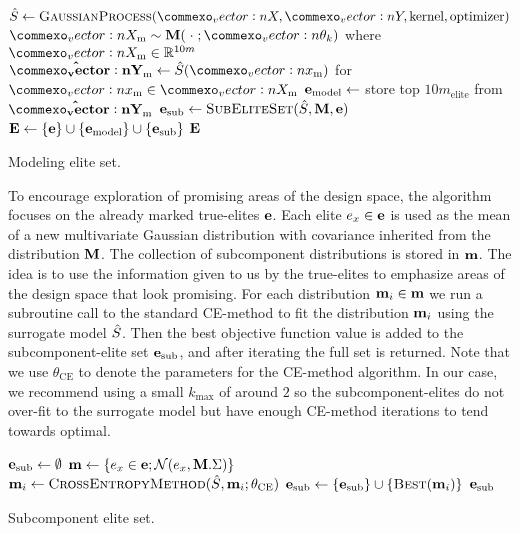 \begin{algorithm}[ht]
  \begin{algorithmic}
    \State $\surrogate \leftarrow \textproc{GaussianProcess}(\mat{X}, \mat{Y}, \text{kernel}, \text{optimizer})$ %
    \State $\mat{X}_\text{m} \sim \M(\;\cdot\;; \vec{\theta}_k)$ where $\mat{X}_\text{m} \in \R^{10m}$
    \State $\mathbf{\hat{\mat{Y}}}_\text{m} \leftarrow \surrogate(\vec{x}_\text{m})$ for $\vec{x}_\text{m} \in \mat{X}_\text{m}$
    \State $\mathbf{e}_\text{model} \leftarrow$ store top $10m_\text{elite}$ from $\mathbf{\hat{\mat{Y}}}_\text{m}$
    \State $\e_\text{sub} \leftarrow \textproc{SubEliteSet}(\surrogate, \M, \e)$
    \State $\mathbf{E} \leftarrow \{ \mathbf{e} \} \cup \{ \mathbf{e}_\text{model} \} \cup \{ \mathbf{e}_\text{sub} \}$ 
    \State \Return $\mathbf{E}$
  \EndFunction
  \end{algorithmic}
  \caption{\label{alg:model_elite_set} Modeling elite set.}
\end{algorithm}

To encourage exploration of promising areas of the design space, the algorithm  focuses on the already marked true-elites $\mathbf{e}$.
Each elite $e_x \in \mathbf{e}$ is used as the mean of a new multivariate Gaussian distribution with covariance inherited from the distribution $\mathbf{M}$.
The collection of subcomponent distributions is stored in $\mathbf{m}$.
The idea is to use the information given to us by the true-elites to emphasize areas of the design space that look promising.
For each distribution $\mathbf{m}_i \in \mathbf{m}$ we run a subroutine call to the standard CE-method to fit the distribution $\mathbf{m}_i$ using the surrogate model $\hat{S}$. 
Then the best objective function value is added to the subcomponent-elite set $\mathbf{e}_\text{sub}$, and after iterating the full set is returned.
Note that we use $\theta_\text{CE}$ to denote the parameters for the CE-method algorithm.
In our case, we recommend using a small $k_\text{max}$ of around $2$ so the subcomponent-elites do not over-fit to the surrogate model but have enough CE-method iterations to tend towards optimal.

\begin{algorithm}[ht]
  \begin{algorithmic}
    \State $\mathbf{e}_\text{sub} \leftarrow \emptyset$
    \State $\mathbf{m} \leftarrow \{ e_x \in \mathbf{e} ; \operatorname{\mathcal{N}}(e_x, \mathbf{M}.\Sigma) \}$
        \State $\m_i \leftarrow \textproc{CrossEntropyMethod}(\surrogate, \m_i ; \theta_{\text{CE}})$
        \State $\e_\text{sub} \leftarrow \{\e_\text{sub}\} \cup \{\textproc{Best}(\m_i)\}$
    \EndFor
    \State \Return $\mathbf{e}_\text{sub}$
  \EndFunction
  \end{algorithmic}
  \caption{\label{alg:sub_elite_set} Subcomponent elite set.}
\end{algorithm}



